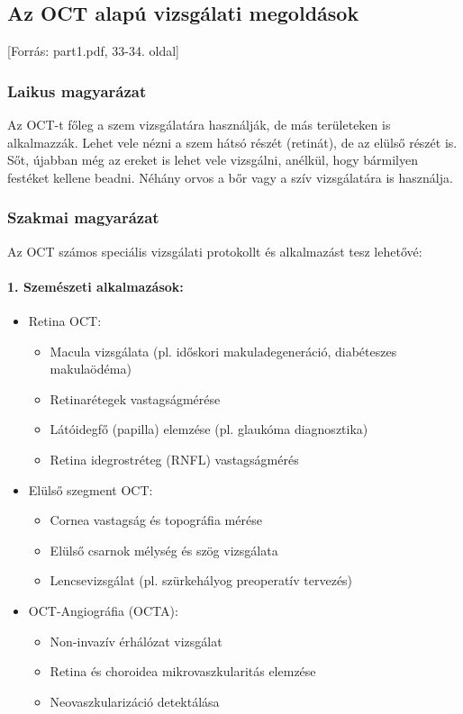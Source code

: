 \documentclass[a4paper,12pt]{article}
\begin{document}
\subsection{Az OCT alapú vizsgálati megoldások} [Forrás: part1.pdf, 33-34. oldal]

\subsubsection{Laikus magyarázat} Az OCT-t főleg a szem vizsgálatára használják, de más területeken is alkalmazzák. Lehet vele nézni a szem hátsó részét (retinát), de az elülső részét is. Sőt, újabban még az ereket is lehet vele vizsgálni, anélkül, hogy bármilyen festéket kellene beadni. Néhány orvos a bőr vagy a szív vizsgálatára is használja.

\subsubsection{Szakmai magyarázat} Az OCT számos speciális vizsgálati protokollt és alkalmazást tesz lehetővé:

\paragraph{1. Szemészeti alkalmazások:} \begin{itemize} \item Retina OCT: \begin{itemize} \item Macula vizsgálata (pl. időskori makuladegeneráció, diabéteszes makulaödéma) \item Retinarétegek vastagságmérése \item Látóidegfő (papilla) elemzése (pl. glaukóma diagnosztika) \item Retina idegrostréteg (RNFL) vastagságmérés \end{itemize} \item Elülső szegment OCT: \begin{itemize} \item Cornea vastagság és topográfia mérése \item Elülső csarnok mélység és szög vizsgálata \item Lencsevizsgálat (pl. szürkehályog preoperatív tervezés) \end{itemize} \item OCT-Angiográfia (OCTA): \begin{itemize} \item Non-invazív érhálózat vizsgálat \item Retina és choroidea mikrovaszkularitás elemzése \item Neovaszkularizáció detektálása \end{itemize} \end{itemize}
\end{document}
